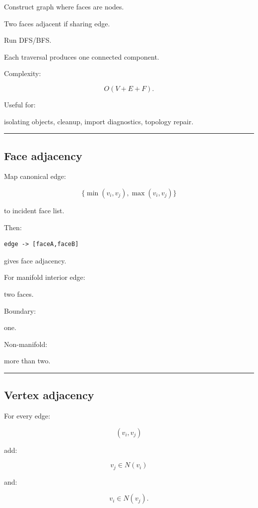 Construct graph where faces are nodes.

Two faces adjacent if sharing edge.

Run DFS/BFS.

Each traversal produces one connected component.

Complexity:

\[
O(V+E+F).
\]

Useful for:

isolating objects, cleanup, import diagnostics, topology repair.

\begin{center}\rule{0.5\linewidth}{0.5pt}\end{center}

\subsection{Face adjacency}\label{04-visual-computing-ii-ch041-face-adjacency}

Map canonical edge:

\[
\{\min(v_i,v_j),\max(v_i,v_j)\}
\]

to incident face list.

Then:

\begin{verbatim}
edge -> [faceA,faceB]
\end{verbatim}

gives face adjacency.

For manifold interior edge:

two faces.

Boundary:

one.

Non-manifold:

more than two.

\begin{center}\rule{0.5\linewidth}{0.5pt}\end{center}

\subsection{Vertex adjacency}\label{04-visual-computing-ii-ch041-vertex-adjacency}

For every edge:

\[
(v_i,v_j)
\]

add:

\[
v_j\in N(v_i)
\]

and:

\[
v_i\in N(v_j).
\]

